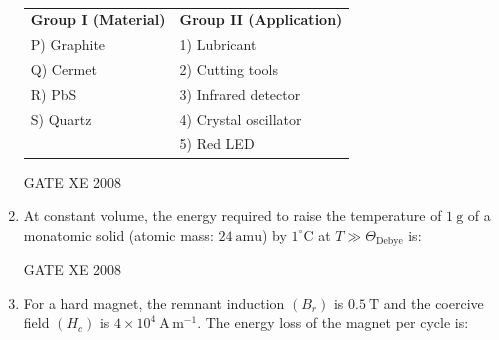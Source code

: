 \documentclass[12pt]{article}
\begin{document}
\begin{enumerate}[label=Q\arabic*.]
\begin{table}[H]     \centering     \caption{}     \label{}     \begin{tabular}{l l}
\textbf{Group I (Material)} & \textbf{Group II (Application)} \\
P) Graphite & 1) Lubricant \\
Q) Cermet & 2) Cutting tools \\
R) PbS & 3) Infrared detector \\
S) Quartz & 4) Crystal oscillator \\
 & 5) Red LED \\
\end{tabular} \end{table}

\begin{enumerate}[label=(\Alph*)]
\end{enumerate}

GATE XE 2008

\item At constant volume, the energy required to raise the temperature of $1 \ \mathrm{g}$ of a monatomic solid (atomic mass: $24 \ \mathrm{amu}$) by $1^\circ \mathrm{C}$ at $T \gg \Theta_{\mathrm{Debye}}$ is:

\begin{enumerate}[label=(\Alph*)]
\end{enumerate}

GATE XE 2008

\item For a hard magnet, the remnant induction $(B_r)$ is $0.5 \ \mathrm{T}$ and the coercive field $(H_c)$ is $4 \times 10^4 \ \mathrm{A \, m^{-1}}$. The energy loss of the magnet per cycle is:

\begin{enumerate}[label=(\Alph*)]
\end{enumerate}


\end{enumerate}
\end{document}
